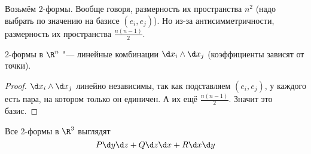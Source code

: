 \begin{Rem}
	Возьмём 2-формы.
	Вообще говоря, размерность их пространства $n^2$ (надо выбрать по значению на базисе $(e_i, e_j)$).
	Но из-за антисимметричности, размерность их пространства $\frac{n(n-1)}2$.
\end{Rem}

\begin{theorem}
	2-формы в $\R^n$ "--- линейные комбинации $\d x_i \wedge \d x_j$ (коэффициенты зависят от точки).
\end{theorem}
\begin{proof}
	$\d x_i \wedge \d x_j$ линейно независимы, так как подставляем $(e_i, e_j)$, у каждого есть пара, на котором только он единичен.
	А их ещё $\frac{n(n-1)}2$.
	Значит это базис.
\end{proof}

\begin{conseq}
	Все 2-формы в $\R^3$ выглядят
	\[ P \d y \d z + Q \d z \d x + R \d x \d y \]
\end{conseq}
